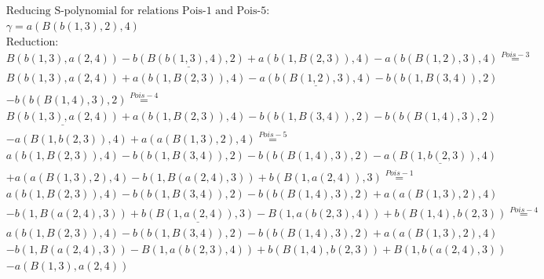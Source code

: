 \documentclass[11pt]{amsart}
\begin{document}
\begin{align*} 
& \text{Reducing S-polynomial for relations Pois-1 and Pois-5:} \\ 
& \gamma = a(B(b(1,3),2),4) \\ 
& \text{Reduction}: \\&B(b(1,3),a(2,4)) - \underline{b(B(b(1,3),4),2)} + a(b(1,B(2,3)),4) - a(b(B(1,2),3),4) \stackrel{ Pois-3 }{=}  \\ 
&B(b(1,3),a(2,4)) + a(b(1,B(2,3)),4) - \underline{a(b(B(1,2),3),4)} - b(b(1,B(3,4)),2)\\ 
 &  - b(b(B(1,4),3),2) \stackrel{ Pois-4 }{=}  \\ 
&\underline{B(b(1,3),a(2,4))} + a(b(1,B(2,3)),4) - b(b(1,B(3,4)),2) - b(b(B(1,4),3),2)\\ 
 &  - a(B(1,b(2,3)),4) + a(a(B(1,3),2),4) \stackrel{ Pois-5 }{=}  \\ 
&a(b(1,B(2,3)),4) - b(b(1,B(3,4)),2) - b(b(B(1,4),3),2) - \underline{a(B(1,b(2,3)),4)}\\ 
 &  + a(a(B(1,3),2),4) - b(1,B(a(2,4),3)) + b(B(1,a(2,4)),3) \stackrel{ Pois-1 }{=}  \\ 
&a(b(1,B(2,3)),4) - b(b(1,B(3,4)),2) - b(b(B(1,4),3),2) + a(a(B(1,3),2),4)\\ 
 &  - b(1,B(a(2,4),3)) + \underline{b(B(1,a(2,4)),3)} - B(1,a(b(2,3),4)) + b(B(1,4),b(2,3)) \stackrel{ Pois-4 }{=}  \\ 
&a(b(1,B(2,3)),4) - b(b(1,B(3,4)),2) - b(b(B(1,4),3),2) + a(a(B(1,3),2),4)\\ 
 &  - b(1,B(a(2,4),3)) - B(1,a(b(2,3),4)) + b(B(1,4),b(2,3)) + B(1,b(a(2,4),3))\\ 
 &  - a(B(1,3),a(2,4))\\ 
\end{align*} 
 
\end{document}
